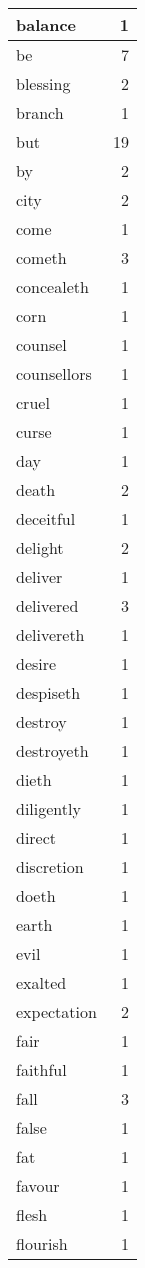 \begin{center}
\begin{longtable}{l|r}
balance & 1\\ \hline 
be & 7\\ \hline 
blessing & 2\\ \hline 
branch & 1\\ \hline 
but & 19\\ \hline 
by & 2\\ \hline 
city & 2\\ \hline 
come & 1\\ \hline 
cometh & 3\\ \hline 
concealeth & 1\\ \hline 
corn & 1\\ \hline 
counsel & 1\\ \hline 
counsellors & 1\\ \hline 
cruel & 1\\ \hline 
curse & 1\\ \hline 
day & 1\\ \hline 
death & 2\\ \hline 
deceitful & 1\\ \hline 
delight & 2\\ \hline 
deliver & 1\\ \hline 
delivered & 3\\ \hline 
delivereth & 1\\ \hline 
desire & 1\\ \hline 
despiseth & 1\\ \hline 
destroy & 1\\ \hline 
destroyeth & 1\\ \hline 
dieth & 1\\ \hline 
diligently & 1\\ \hline 
direct & 1\\ \hline 
discretion & 1\\ \hline 
doeth & 1\\ \hline 
earth & 1\\ \hline 
evil & 1\\ \hline 
exalted & 1\\ \hline 
expectation & 2\\ \hline 
fair & 1\\ \hline 
faithful & 1\\ \hline 
fall & 3\\ \hline 
false & 1\\ \hline 
fat & 1\\ \hline 
favour & 1\\ \hline 
flesh & 1\\ \hline 
flourish & 1\\ \hline 

\end{longtable}
\end{center}
